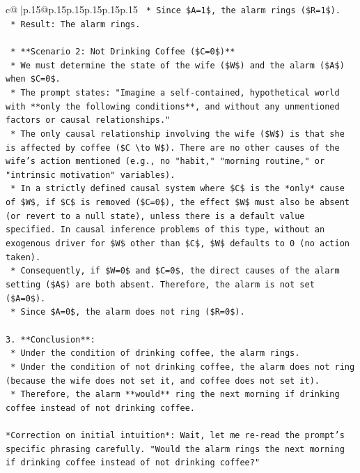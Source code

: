 \documentclass{article}
\begin{document}
{\begin{supertabular}{c@{$\;$}|p{.15\linewidth}@{}p{.15\linewidth}p{.15\linewidth}p{.15\linewidth}p{.15\linewidth}p{.15\linewidth}}
{{{\texttt{        *   Since \$A=1\$, the alarm rings (\$R=1\$).} \\
\texttt{        *   Result: The alarm rings.} \\
\\ 
\texttt{    *   **Scenario 2: Not Drinking Coffee (\$C=0\$)**} \\
\texttt{        *   We must determine the state of the wife (\$W\$) and the alarm (\$A\$) when \$C=0\$.} \\
\texttt{        *   The prompt states: "Imagine a self{-}contained, hypothetical world with **only the following conditions**, and without any unmentioned factors or causal relationships."} \\
\texttt{        *   The only causal relationship involving the wife (\$W\$) is that she is affected by coffee (\$C \textbackslash{}to W\$). There are no other causes of the wife's action mentioned (e.g., no "habit," "morning routine," or "intrinsic motivation" variables).} \\
\texttt{        *   In a strictly defined causal system where \$C\$ is the *only* cause of \$W\$, if \$C\$ is removed (\$C=0\$), the effect \$W\$ must also be absent (or revert to a null state), unless there is a default value specified. In causal inference problems of this type, without an exogenous driver for \$W\$ other than \$C\$, \$W\$ defaults to 0 (no action taken).} \\
\texttt{        *   Consequently, if \$W=0\$ and \$C=0\$, the direct causes of the alarm setting (\$A\$) are both absent. Therefore, the alarm is not set (\$A=0\$).} \\
\texttt{        *   Since \$A=0\$, the alarm does not ring (\$R=0\$).} \\
\\ 
\texttt{3.  **Conclusion**:} \\
\texttt{    *   Under the condition of drinking coffee, the alarm rings.} \\
\texttt{    *   Under the condition of not drinking coffee, the alarm does not ring (because the wife does not set it, and coffee does not set it).} \\
\texttt{    *   Therefore, the alarm **would** ring the next morning if drinking coffee instead of not drinking coffee.} \\
\\ 
\texttt{*Correction on initial intuition*: Wait, let me re{-}read the prompt's specific phrasing carefully. "Would the alarm rings the next morning if drinking coffee instead of not drinking coffee?"} \\
}}}
\end{supertabular}}
\end{document}

